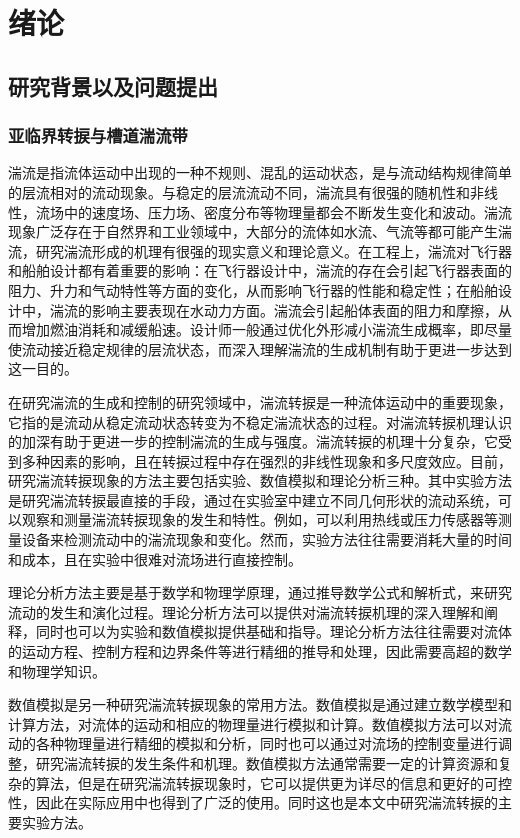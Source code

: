 \chapter{绪论}
\section{研究背景以及问题提出}
\subsection{亚临界转捩与槽道湍流带}
湍流是指流体运动中出现的一种不规则、混乱的运动状态，是与流动结构规律简单的层流相对的流动现象。与稳定的层流流动不同，湍流具有很强的随机性和非线性，流场中的速度场、压力场、密度分布等物理量都会不断发生变化和波动。湍流现象广泛存在于自然界和工业领域中，大部分的流体如水流、气流等都可能产生湍流，研究湍流形成的机理有很强的现实意义和理论意义。在工程上，湍流对飞行器和船舶设计都有着重要的影响：在飞行器设计中，湍流的存在会引起飞行器表面的阻力、升力和气动特性等方面的变化，从而影响飞行器的性能和稳定性；在船舶设计中，湍流的影响主要表现在水动力方面。湍流会引起船体表面的阻力和摩擦，从而增加燃油消耗和减缓船速。设计师一般通过优化外形减小湍流生成概率，即尽量使流动接近稳定规律的层流状态，而深入理解湍流的生成机制有助于更进一步达到这一目的。

在研究湍流的生成和控制的研究领域中，湍流转捩是一种流体运动中的重要现象，它指的是流动从稳定流动状态转变为不稳定湍流状态的过程。对湍流转捩机理认识的加深有助于更进一步的控制湍流的生成与强度。湍流转捩的机理十分复杂，它受到多种因素的影响，且在转捩过程中存在强烈的非线性现象和多尺度效应。目前，研究湍流转捩现象的方法主要包括实验、数值模拟和理论分析三种。其中实验方法是研究湍流转捩最直接的手段，通过在实验室中建立不同几何形状的流动系统，可以观察和测量湍流转捩现象的发生和特性。例如，可以利用热线或压力传感器等测量设备来检测流动中的湍流现象和变化。然而，实验方法往往需要消耗大量的时间和成本，且在实验中很难对流场进行直接控制。

理论分析方法主要是基于数学和物理学原理，通过推导数学公式和解析式，来研究流动的发生和演化过程。理论分析方法可以提供对湍流转捩机理的深入理解和阐释，同时也可以为实验和数值模拟提供基础和指导。理论分析方法往往需要对流体的运动方程、控制方程和边界条件等进行精细的推导和处理，因此需要高超的数学和物理学知识。

数值模拟是另一种研究湍流转捩现象的常用方法。数值模拟是通过建立数学模型和计算方法，对流体的运动和相应的物理量进行模拟和计算。数值模拟方法可以对流动的各种物理量进行精细的模拟和分析，同时也可以通过对流场的控制变量进行调整，研究湍流转捩的发生条件和机理。数值模拟方法通常需要一定的计算资源和复杂的算法，但是在研究湍流转捩现象时，它可以提供更为详尽的信息和更好的可控性，因此在实际应用中也得到了广泛的使用。同时这也是本文中研究湍流转捩的主要实验方法。


